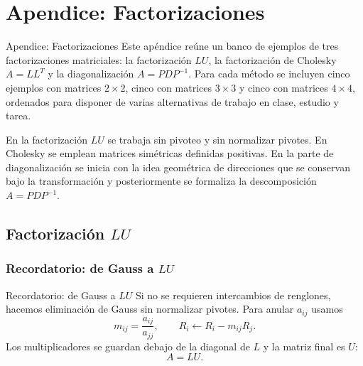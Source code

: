\documentclass[aspectratio=169,11pt]{beamer}
\theoremstyle{remark}
\begin{document}
\section{Apendice: Factorizaciones}
\begin{frame}[allowframebreaks]{Apendice: Factorizaciones}
\footnotesize
Este apéndice reúne un banco de ejemplos de tres factorizaciones matriciales: la factorización \(LU\), la factorización de Cholesky \(A=LL^{T}\) y la diagonalización \(A=PDP^{-1}\). Para cada método se incluyen cinco ejemplos con matrices \(2\times2\), cinco con matrices \(3\times3\) y cinco con matrices \(4\times4\), ordenados para disponer de varias alternativas de trabajo en clase, estudio y tarea.

En la factorización \(LU\) se trabaja sin pivoteo y sin normalizar pivotes. En Cholesky se emplean matrices simétricas definidas positivas. En la parte de diagonalización se inicia con la idea geométrica de direcciones que se conservan bajo la transformación y posteriormente se formaliza la descomposición \(A=PDP^{-1}\).

\end{frame}

\subsection*{Factorización $LU$}
\subsubsection*{Recordatorio: de Gauss a $LU$}
\begin{frame}[allowframebreaks]{Recordatorio: de Gauss a $LU$}
\footnotesize
Si no se requieren intercambios de renglones, hacemos eliminación de Gauss sin normalizar pivotes. Para anular $a_{ij}$ usamos
\[
m_{ij}=\frac{a_{ij}}{a_{jj}},\qquad R_i\leftarrow R_i-m_{ij}R_j.
\]
Los multiplicadores se guardan debajo de la diagonal de $L$ y la matriz final es $U$:
\[
\boxed{A=LU}.
\]
\end{frame}
\end{document}

